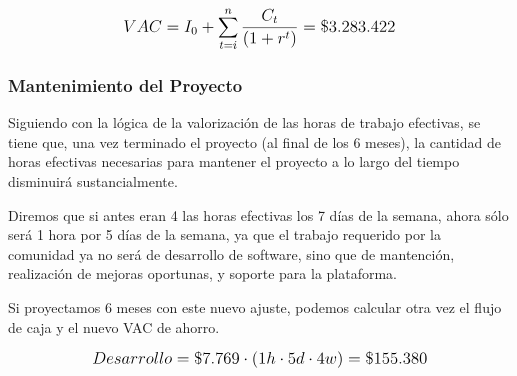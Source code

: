 \[
\mathlarger{
	{VAC} = I_0 + \sum\limits_{t=i}^{n}\frac{C_t}{\left(1+r^t\right)} = \$3.283.422
}
\]

\subsubsection{Mantenimiento del Proyecto}
Siguiendo con la lógica de la valorización de las horas de trabajo efectivas, se tiene que, una vez terminado el proyecto (al final de los 6 meses), la cantidad de horas efectivas necesarias para mantener el proyecto a lo largo del tiempo disminuirá sustancialmente.

Diremos que si antes eran 4 las horas efectivas los 7 días de la semana, ahora sólo será 1 hora por 5 días de la semana, ya que el trabajo requerido por la comunidad ya no será de desarrollo de software, sino que de mantención, realización de mejoras oportunas, y soporte para la plataforma.

Si proyectamos 6 meses con este nuevo ajuste, podemos calcular otra vez el flujo de caja y el nuevo VAC de ahorro.

\[
\mathlarger{
	Desarrollo = \$7.769 \cdot \left(1h\cdot5d\cdot4w\right) = \$155.380
}
\]

